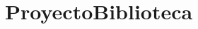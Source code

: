 \chapter{Proyecto\+Biblioteca }
\hypertarget{md__r_e_a_d_m_e}{}\label{md__r_e_a_d_m_e}
\label{md__r_e_a_d_m_e_autotoc_md0}%
%
